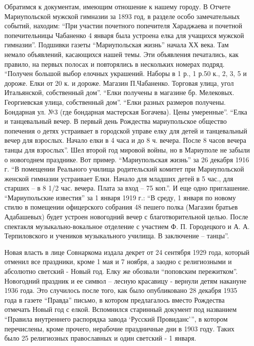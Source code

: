 Обратимся к документам, имеющим отношение к нашему городу. В Отчете
Мариупольской мужской гимназии за 1893 год, в разделе особо замечательных
событий, находим: \enquote{При участии почетного попечителя Хараджаева и почетной
попечительницы Чабаненко 4 января была устроена елка для учащихся мужской
гимназии}. Подшивки газеты \enquote{Мариупольская жизнь} начала ХХ века. Там немало
объявлений, касающихся нашей темы. Эти объявления печатались, как правило, на
первых полосах  и повторялись в нескольких номерах  подряд. \enquote{Получен большой
выбор елочных украшений. Наборы в 1 р., 1 р.50 к., 2, 3, 5 и дороже. Елки от 20
к. и дороже. Магазин П.Чабаненко. Торговая улица, угол Итальянской, собственный
дом}. \enquote{Елки получены в магазине бр. Мелековых. Георгиевская улица, собственный
дом}. \enquote{Елки разных размеров получены. Бондарная ул. №3 (где бондарная
мастерская Богачева). Цены умеренные}. \enquote{Елка и танцевальный вечер. В первый
день Рождества мариупольское общество попечения о детях устраивает в городской
управе елку для детей и танцевальный вечер для взрослых. Начало елки в 4 часа и
до 8 ч. вечера. После 8 часов вечера танцы для взрослых}. Шел второй год
мировой войны,  но в Мариуполе не забыли о новогоднем празднике. Вот пример.
\enquote{Мариупольская жизнь} за 26 декабря 1916 г. \enquote{В помещении Реального училища
родительский комитет при Мариупольской женской гимназии устраивает Елки. Начало
для младших детей в 5 час., для старших – в 8 1/2  час. вечера. Плата за вход –
75 коп.}. И еще одно приглашение. \enquote{Мариупольские известия} за 1 января 1919 г.:
\enquote{В среду, 1 января по новому стилю в помещении офицерского собрания 48 пешего
полка (Магазин братьев Адабашевых) будет устроен новогодний вечер с
благотворительной целью. После спектакля музыкально-вокальное отделение с
участием Ф. П. Городецкого и А. А. Терпиловского и учеников музыкального училища. В
заключение – танцы}.


Новая власть в лице Совнаркома издала декрет от 24 сентября 1929 года, который
отменил все праздники, кроме 1 мая и 7 ноября, а заодно с религиозными и
абсолютно светский - Новый год.  Елку же обозвали \enquote{поповским пережитком}.
Новогодний праздник и ее символ – лесную красавицу - вернули детям накануне
1936 года. Это случилось после того, как было  опубликовано 28 декабря 1935
года в газете \enquote{Правда} письмо, в котором предлагалось вместо Рождества отмечать
Новый год с елкой. Вспомнился  старинный документ под  названием \enquote{Правила
внутреннего распорядка завода \enquote{Русский Провиданс}}, в котором перечислены, кроме
прочего, нерабочие праздничные дни в 1903 году. Таких было 25 религиозных
православных и один светский - 1 января.


